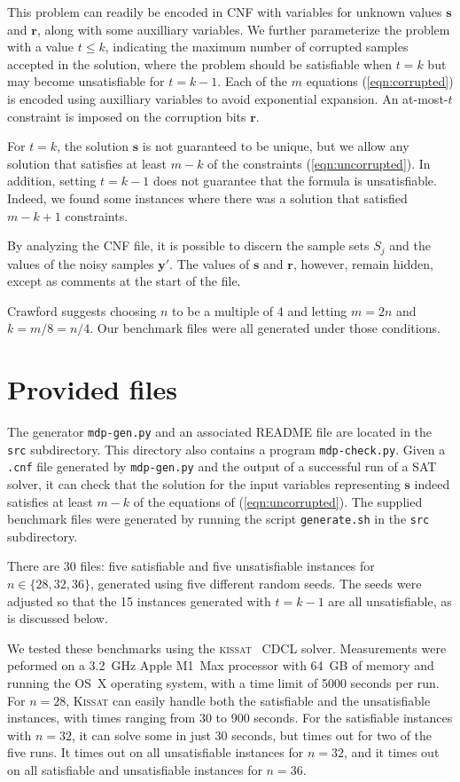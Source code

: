 \documentclass[10pt,conference]{IEEEtran}
\newcommand{\kissat}{{\sffamily\scshape kissat}}
\newcommand{\Kissat}{{\sffamily\scshape  Kissat}}
\begin{document}
This problem can readily be encoded in CNF with variables for
unknown values $\bm{s}$ and $\bm{r}$, along with some auxilliary
variables.  We further parameterize the problem with a value
$t \leq k$, indicating the maximum number of corrupted samples accepted in the
solution, where the problem should be satisfiable when $t = k$ but may
become unsatisfiable for $t = k-1$.  Each of the $m$ equations
(\ref{eqn:corrupted}) is encoded using auxilliary variables to avoid
exponential expansion.  An at-most-$t$ constraint is imposed on the
corruption bits $\bm{r}$.

For $t=k$, the solution $\bm{s}$ is not guaranteed to be unique, but
we allow any solution that satisfies at least $m-k$ of the constraints
(\ref{eqn:uncorrupted}).  In addition, setting $t=k-1$ does not guarantee that the
formula is unsatisfiable.  Indeed, we found some instances where there was a solution that satisfied $m-k+1$ constraints.

By analyzing the CNF file, it is
possible to discern the sample sets $S_j$ and the values of the noisy
samples $\bm{y}'$.  The values of $\bm{s}$ and $\bm{r}$, however,
remain hidden, except as comments at the start of the file.

Crawford suggests choosing $n$ to be a multiple of 4 and letting
$m = 2n$ and $k = m/8 = n/4$.  Our benchmark files were all generated under
those conditions.

\section{Provided files}

The generator \texttt{mdp-gen.py} and an associated README file are
located in the \texttt{src} subdirectory.  This directory also
contains a program \texttt{mdp-check.py}.  Given a \texttt{.cnf} file
generated by \texttt{mdp-gen.py} and the output of a successful run of
a SAT solver, it can check that the solution for the input variables
representing $\bm{s}$ indeed satisfies at least $m-k$ of the equations of (\ref{eqn:uncorrupted}).
The supplied benchmark files were generated by running the script
\texttt{generate.sh} in the \texttt{src} subdirectory.

There are 30 files: five satisfiable and five unsatisfiable instances
for $n \in \{28, 32, 36\}$, generated using five different random
seeds.  The seeds were adjusted so that the 15 instances generated
with $t=k-1$ are all unsatisfiable, as is discussed below.

We tested these benchmarks using the
\kissat{}~\cite{biere-kissat-2020} CDCL solver.  Measurements were
peformed on a 3.2~GHz Apple M1~Max processor with 64~GB of memory and
running the OS~X operating system, with a time limit of 5000 seconds
per run.  For $n=28$, \Kissat{} can easily handle both the satisfiable
and the unsatisfiable instances, with times ranging from
30 to 900 seconds.  For the satisfiable instances with $n=32$, it can
solve some in just 30 seconds, but times out for two of the five
runs.  It times out on all unsatisfiable instances for $n=32$, and
it times out on all satisfiable and unsatisfiable instances for
$n=36$.
\end{document}
